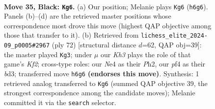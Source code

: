 \documentclass[11pt]{article}
\begin{document}
\clearpage

\begin{figure}[p]\centering
\begin{subfigure}{0.46\textwidth}\centering
\resizebox{\linewidth}{!}{%
\newchessgame
\chessboard[
  setfen={7R/1b3pp1/4p2k/1p5p/1r1PnP1P/2NBP1P1/8/6K1 b - - 9 35},
  showmover=false,
  pgfstyle=straightmove, color=movearrow, markmove={h6-g6}
]}
\caption{}
\end{subfigure}\hfill
\begin{subfigure}{0.46\textwidth}\centering
\resizebox{\linewidth}{!}{%
\newchessgame
\chessboard[
  setfen={8/p1N3k1/2R2p2/1P1p3p/1P1P2p1/3b1P2/4rKPP/8 w - - 1 37},
  showmover=false,
  pgfstyle=straightmove, color=movearrow, markmove={f2-g3}
]}
\caption{}
\end{subfigure}
\\[4pt]

\caption{\textbf{Move 35, Black: \texttt{Kg6}.} (a) Our position; Melanie plays \texttt{Kg6} (\texttt{h6g6}). Panels (b)--(d) are the retrieved master positions whose correspondence most drove this move (highest QAP objective among those that transfer to it). (b) Retrieved from \texttt{lichess\_elite\_2024-09\_p0005\#2967} (ply 72) [structural distance $d$=62, QAP obj=39]: the master played \texttt{Kg3}; under $\mu$ our \emph{Kh3} plays the role of that game's \emph{Kf2}; cross-type roles: our \emph{N}e4 as their \emph{P}h2, our \emph{p}f4 as their \emph{b}d3; transferred move \texttt{h6g6} \textbf{(endorses this move)}. Synthesis: 1 retrieved analog transferred to \texttt{Kg6} (summed QAP objective 39, the strongest correspondence among the candidate moves); Melanie committed it via the \texttt{search} selector.}
\label{fig:thought-m69}
\end{figure}

\clearpage
\end{document}
